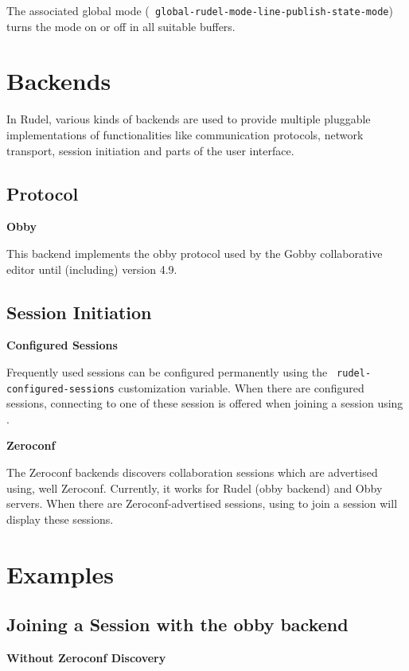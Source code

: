 The associated global mode ({\tt
global-rudel-mode-line-publish-state-mode}) turns the mode on or off
in all suitable buffers.

\eject

\section{Backends}

\lesssectionskip
In Rudel, various kinds of backends are used to provide multiple
pluggable implementations of functionalities like communication
protocols, network transport, session initiation and parts of the user
interface.

\subsection{Protocol}

{\bf Obby}

This backend implements the obby protocol used by the Gobby
collaborative editor until (including) version 4.9.

\subsection{Session Initiation}

{\bf Configured Sessions}

Frequently used sessions can be configured permanently using the {\tt
rudel-configured-sessions} customization variable. When there are
configured sessions, connecting to one of these session is offered
when joining a session using .

{\bf Zeroconf}

The Zeroconf backends discovers collaboration sessions which are
advertised using, well Zeroconf. Currently, it works for Rudel (obby
backend) and Obby servers. When there are Zeroconf-advertised
sessions, using  to join a session will display these
sessions.

\section{Examples}

\subsection{Joining a Session with the obby backend}

{\bf Without Zeroconf Discovery}

